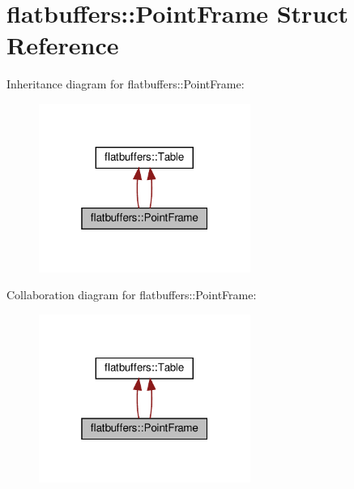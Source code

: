 \hypertarget{structflatbuffers_1_1PointFrame}{}\section{flatbuffers\+:\+:Point\+Frame Struct Reference}
\label{structflatbuffers_1_1PointFrame}


Inheritance diagram for flatbuffers\+:\+:Point\+Frame\+:
\nopagebreak
\begin{figure}[H]
\begin{center}
\leavevmode
\includegraphics[width=196pt]{structflatbuffers_1_1PointFrame__inherit__graph}
\end{center}
\end{figure}


Collaboration diagram for flatbuffers\+:\+:Point\+Frame\+:
\nopagebreak
\begin{figure}[H]
\begin{center}
\leavevmode
\includegraphics[width=196pt]{structflatbuffers_1_1PointFrame__coll__graph}
\end{center}
\end{figure}
